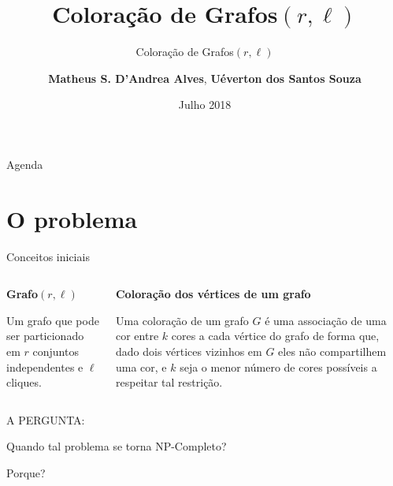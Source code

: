 \documentclass[9pt, compress]{beamer}
\author{\textbf{Matheus S. D'Andrea Alves}, \textbf{Uéverton dos Santos Souza} }
\title{Coloração de Grafos$(r,\ell)$}
\subtitle{Coloração de Grafos$(r,\ell)$}
\institute{\textbf{Universidade Federal Fluminense}}
\date{Julho 2018}
\begin{document}
    \maketitle
    \begin{frame}{Agenda}
    \centering
        \tableofcontents
    \end{frame}
    \section{O problema}
    \begin{frame}{Conceitos iniciais}
      \begin{columns}
        \begin{column}{0.5\textwidth}
          \textbf{Grafo$(r,\ell)$}
          
          Um grafo que pode ser particionado em $r$ conjuntos independentes e $\ell$ cliques.
        \end{column}
        \begin{column}{0.5\textwidth}
          \textbf{Coloração dos vértices de um grafo}
          
          Uma coloração de um grafo $G$ é uma associação de uma cor entre $k$ cores a cada vértice do grafo de forma que, dado dois vértices vizinhos em $G$ eles não compartilhem uma cor, e $k$ seja o menor número de cores possíveis a respeitar tal restrição. 
        \end{column}
      \end{columns}
    \end{frame}
    \begin{frame}[standout]
      A PERGUNTA:
      
      Quando tal problema se torna NP-Completo? 
      
      Porque?
    \end{frame}
\end{document}
